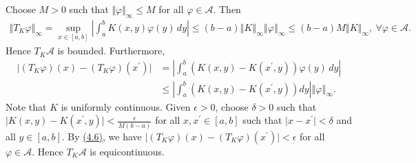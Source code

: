 \documentclass{article}
\begin{document}
Choose $M>0$ such that $\Vert\varphi\Vert_\infty\leq M$ for all $\varphi\in\mathcal{A}$. Then
\begin{align*}
	\Vert T_K\varphi\Vert_\infty = \sup_{x\in[a,b]}\left\vert\int_a^b K(x,y)\varphi(y)\,dy\right\vert\leq (b-a)\left\Vert K\right\Vert_\infty\left\Vert\varphi\right\Vert_\infty \leq (b-a)M\left\Vert K\right\Vert_\infty,\ \forall\varphi\in\mathcal{A}.
\end{align*}
Hence $T_K\mathcal{A}$ is bounded. Furthermore,
\begin{align*}
	\vert (T_K\varphi)(x) - (T_K\varphi)(x^\prime)\vert &= \left\vert\int_a^b \left(K(x,y)-K(x^\prime,y)\right)\varphi(y)\,dy\right\vert\\
	&\leq \left\vert\int_a^b \left(K(x,y)-K(x^\prime,y)\right)dy\right\vert\left\Vert\varphi\right\Vert_\infty.\tag{4.6}\label{eq:4.6}
\end{align*}
Note that $K$ is uniformly continuous. Given $\epsilon>0$, choose $\delta>0$ such that $\vert K(x,y) - K(x^\prime,y)\vert < \frac{\epsilon}{M(b-a)}$ for all $x,x^\prime\in[a,b]$ such that $\vert x-x^\prime\vert < \delta$ and all $y\in[a,b]$. By \hyperref[eq:4.6]{(4.6)}, we have $\vert (T_K\varphi)(x) - (T_K\varphi)(x^\prime)\vert < \epsilon$ for all $\varphi\in\mathcal{A}$. Hence $T_K\mathcal{A}$ is equicontinuous.
\end{document}
